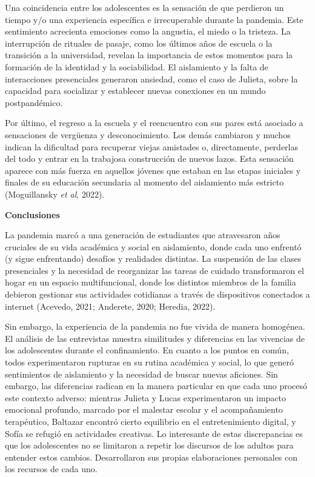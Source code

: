 Una coincidencia entre los adolescentes es la sensación de que perdieron un tiempo y/o una experiencia específica e irrecuperable durante la pandemia. Este sentimiento acrecienta emociones como la angustia, el miedo o la tristeza. La interrupción de rituales de pasaje, como los últimos años de escuela o la transición a la universidad, revelan la importancia de estos momentos para la formación de la identidad y la sociabilidad. El aislamiento y la falta de interacciones presenciales generaron ansiedad, como el caso de Julieta, sobre la capacidad para socializar y establecer nuevas conexiones en un mundo postpandémico.

Por último, el regreso a la escuela y el reencuentro con sus pares está asociado a sensaciones de vergüenza y desconocimiento. Los demás cambiaron y muchos indican la dificultad para recuperar viejas amistades o, directamente, perderlas del todo y entrar en la trabajosa construcción de nuevos lazos. Esta sensación aparece con más fuerza en aquellos jóvenes que estaban en las etapas iniciales y finales de su educación secundaria al momento del aislamiento más estricto (Moguillansky \emph{et al}, 2022).

\textbf{Conclusiones}

La pandemia marcó a una generación de estudiantes que atravesaron años cruciales de su vida académica y social en aislamiento, donde cada uno enfrentó (y sigue enfrentando) desafíos y realidades distintas. La suspensión de las clases presenciales y la necesidad de reorganizar las tareas de cuidado transformaron el hogar en un espacio multifuncional, donde los distintos miembros de la familia debieron gestionar sus actividades cotidianas a través de dispositivos conectados a internet (Acevedo, 2021; Anderete, 2020; Heredia, 2022).

Sin embargo, la experiencia de la pandemia no fue vivida de manera homogénea. El análisis de las entrevistas muestra similitudes y diferencias en las vivencias de los adolescentes durante el confinamiento. En cuanto a los puntos en común, todos experimentaron rupturas en su rutina académica y social, lo que generó sentimientos de aislamiento y la necesidad de buscar nuevas aficiones. Sin embargo, las diferencias radican en la manera particular en que cada uno procesó este contexto adverso: mientras Julieta y Lucas experimentaron un impacto emocional profundo, marcado por el malestar escolar y el acompañamiento terapéutico, Baltazar encontró cierto equilibrio en el entretenimiento digital, y Sofía se refugió en actividades creativas. Lo interesante de estas discrepancias es que los adolescentes no se limitaron a repetir los discursos de los adultos para entender estos cambios. Desarrollaron sus propias elaboraciones personales con los recursos de cada uno.

